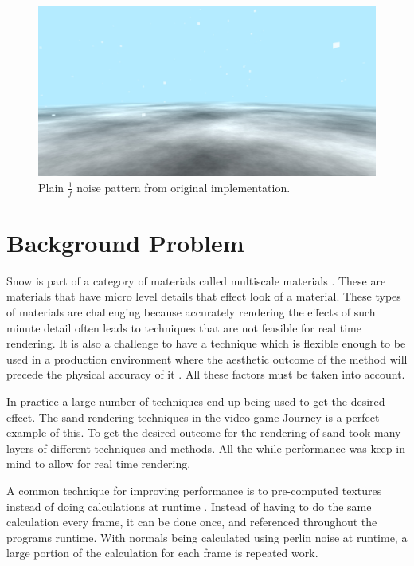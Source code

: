 \documentclass{IEEEtran}
\begin{document}
\begin{figure}
    \includegraphics[width=\linewidth]{images/fnoise.jpg}
    \caption{Plain \(\tfrac{1}{f}\) noise pattern from original implementation.}
    \label{fig:fnoise}
\end{figure}

\section{Background Problem}

Snow is part of a category of materials called multiscale materials
\cite{multiscale}. These are materials that have micro level details that
effect look of a material. These types of materials are challenging because
accurately rendering the effects of such minute detail often leads to techniques
that are not feasible for real time rendering. It is also a challenge to have a
technique which is flexible enough to be used in a production environment where
the aesthetic outcome of the method will precede the physical accuracy of it
\cite{sparkle}. All these factors must be taken into account.

In practice a large number of techniques end up being used to get the desired
effect. The sand rendering techniques in the video game Journey \cite{journey} is a perfect
example of this. To get the desired outcome for the rendering
of sand took many layers of different techniques and methods. All the while
performance was keep in mind to allow for real time rendering.

A common technique for improving performance is to pre-computed textures instead of
doing calculations at runtime \cite{journey}. Instead of having to do the same calculation
every frame, it can be done once, and referenced throughout the programs
runtime. With normals being calculated using perlin noise at runtime, a large
portion of the calculation for each frame is repeated work.
\end{document}

